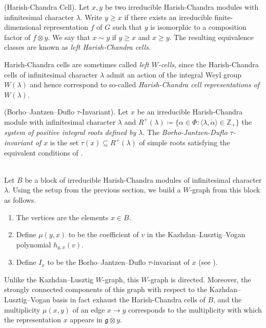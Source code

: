 \noindent\begin{definition}\textup{(Harish-Chandra Cell).} Let $x, y$ be two irreducible Harish-Chandra modules with infinitesimal character $\lambda$. Write $y \geq x$ if there exists an irreducible finite-dimensional representation $f$ of $G$ such that $y$ is isomorphic to a composition factor of $f \otimes y$. We say that $x \sim y$ if $y \geq x$ and $x \geq y$. The resulting equivalence classes are known as {\em left Harish-Chandra cells}.\newpage
\end{definition}

\noindent\begin{remark} Harish-Chandra cells are sometimes called {\em left $W$-cells}, since the Harish-Chandra cells of infinitesimal character $\lambda$ admit an action of the integral Weyl group $W(\lambda)$ and hence correspond to so-called {\em Harish-Chandra cell representations of $W(\lambda)$}.\\
\end{remark}

\noindent\begin{definition}\textup{(Borho--Jantzen--Duflo $\tau$-Invariant).} Let $x$ be an irreducible Harish-Chandra module with infinitesimal character $\lambda$ and $R^+(\lambda) \coloneqq \{\alpha \in \Phi : \langle\lambda, \check{\alpha}\rangle \in \mathbb{Z}_+\}$ the {\em system of positive integral roots defined by $\lambda$}. The {\em Borho-Jantzen-Duflo $\tau$-invariant of $x$} is the set $\tau(x) \subseteq R^+(\lambda)$ of simple roots satisfying the equivalent conditions of \cite[Corollary 7.2.27]{Vog81}.\\[\linespacing]
\end{definition}

\noindent\\ Let $B$ be a block of irreducible Harish-Chandra modules of infinitesimal character $\lambda$. Using the setup from the previous section, we build a $W$-graph from this block as follows.
\begin{enumerate}[label=$\bullet$, leftmargin=4\parindent]
\item The vertices are the elements $x \in B$.
\item Define $\mu(y, x)$ to be the coefficient of $v$ in the Kazhdan--Lusztig--Vogan polynomial $h_{y,x}(v)$.
\item Define $I_x$ to be the Borho--Jantzen--Duflo $\tau$-invariant of $x$ (see \cite[Definition 7.3.8]{Vog81}).
\end{enumerate}
\noindent Unlike the Kazhdan--Lusztig $W$-graph, this $W$-graph is directed. Moreover, the strongly connected components of this graph with respect to the Kazhdan--Lusztig--Vogan basis in fact exhaust the Harish-Chandra cells of $B$, and the multiplicity $\mu(x, y)$ of an edge $x \to y$ corresponds to the multiplicity with which the representation $x$ appears in $\mathfrak{g} \otimes y$.\\

